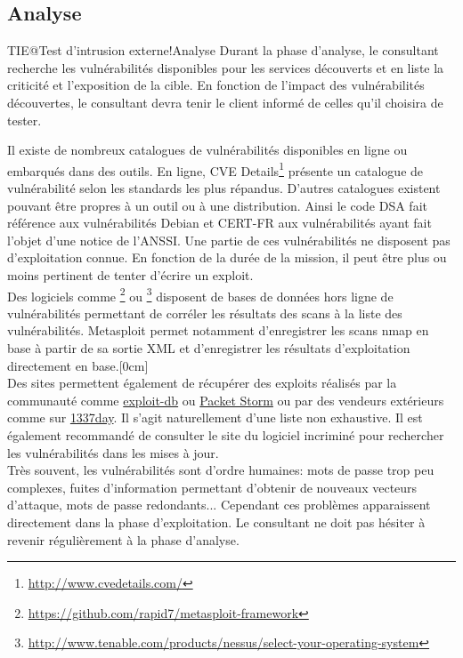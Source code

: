 \documentclass[twoside,a4paper,12pt,titlepage]{book}
\newcommand{\MarginPar}[2]{\marginnote{\scriptsize #1}[#2]}
\begin{document}
\subsection{Analyse}
\begin{Define}{TIE@Test d'intrusion externe!Analyse}
	Durant la phase d'analyse, le consultant recherche les vulnérabilités disponibles pour les services découverts et en liste la criticité et l'exposition de la cible. En fonction de l'impact des vulnérabilités découvertes, le consultant devra tenir le client informé de celles qu'il choisira de tester.
\end{Define}
Il existe de nombreux catalogues de vulnérabilités disponibles en ligne ou embarqués dans des outils. En ligne, CVE Details\footnote{\url{http://www.cvedetails.com/}} présente un catalogue de vulnérabilité selon les standards les plus répandus. D'autres catalogues existent pouvant être propres à un outil ou à une distribution. Ainsi le code DSA fait référence aux vulnérabilités Debian et CERT-FR aux vulnérabilités ayant fait l'objet d'une notice de l'ANSSI. Une partie de ces vulnérabilités ne disposent pas d'exploitation connue. En fonction de la durée de la mission, il peut être plus ou moins pertinent de tenter d'écrire un exploit.\\
Des logiciels comme \footnote{\url{https://github.com/rapid7/metasploit-framework}} ou \footnote{\url{http://www.tenable.com/products/nessus/select-your-operating-system}} disposent de bases de données hors ligne de vulnérabilités permettant de corréler les résultats des scans à la liste des vulnérabilités. Metasploit permet notamment d'enregistrer les scans nmap en base à partir de sa sortie XML et d'enregistrer les résultats d'exploitation directement en base.\MarginPar{\textbf{Recherche de vulnérabilités}}{0cm}\\
	Des sites permettent également de récupérer des exploits réalisés par la communauté comme \href{https://www.exploit-db.com/}{exploit-db} ou \href{https://packetstormsecurity.com/}{Packet Storm} ou par des vendeurs extérieurs comme sur \href{1337day.com}{1337day}. Il s'agit naturellement d'une liste non exhaustive. Il est également recommandé de consulter le site du logiciel incriminé pour rechercher les vulnérabilités dans les mises à jour. \\
	Très souvent, les vulnérabilités sont d'ordre humaines: mots de passe trop peu complexes, fuites d'information permettant d'obtenir de nouveaux vecteurs d'attaque, mots de passe redondants... Cependant ces problèmes apparaissent directement dans la phase d'exploitation. Le consultant ne doit pas hésiter à revenir régulièrement à la phase d'analyse.
\end{document}
